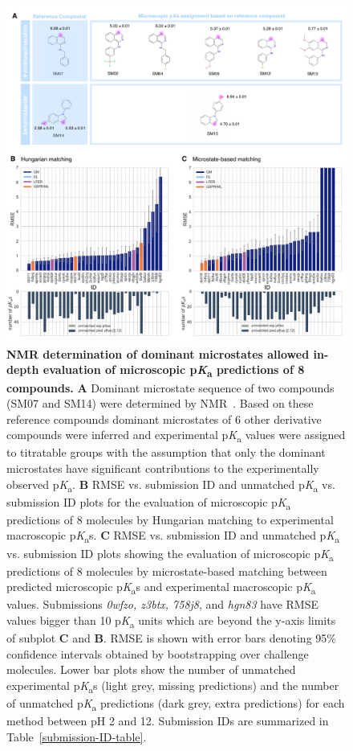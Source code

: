 \documentclass[9pt,lineno,final]{elife}
\newcommand{\pKa}{p\textit{K}\textsubscript{a}}
\begin{document}
\begin{figure}
\centering
\includegraphics[width=1.0\linewidth]{figures/typeI_8_mol_matching_comparison.pdf}
\caption{{\bf NMR determination of dominant microstates allowed in-depth evaluation of microscopic \pKa{} predictions of 8 compounds.} 
{\bf A} Dominant microstate sequence of two compounds (SM07 and SM14) were determined by NMR~\cite{Isik:2018:J.Comput.AidedMol.Des.}. Based on these reference compounds dominant microstates of 6 other derivative compounds were inferred and experimental \pKa{} values were assigned to titratable groups with the assumption that only the dominant microstates have significant contributions to the experimentally observed \pKa{}.
{\bf B} RMSE vs. submission ID and unmatched \pKa{} vs. submission ID plots for the evaluation of microscopic \pKa{} predictions of 8 molecules by Hungarian matching to experimental macroscopic \pKa{}s. {\bf C} RMSE vs. submission ID and unmatched \pKa{} vs. submission ID plots showing the evaluation of microscopic \pKa{} predictions of 8 molecules by microstate-based matching between predicted microscopic \pKa{}s and experimental macroscopic \pKa{} values. Submissions \textit{0wfzo, z3btx, 758j8}, and \textit{hgn83} have RMSE values bigger than 10 \pKa{} units which are beyond the y-axis limits of subplot {\bf C} and {\bf B}.
RMSE is shown with error bars denoting 95\% confidence intervals obtained by bootstrapping over challenge molecules. Lower bar plots show the number of unmatched experimental \pKa{}s (light grey, missing predictions) and the number of unmatched \pKa{} predictions (dark grey, extra predictions) for each method between pH 2 and 12. Submission IDs are summarized in Table~\ref{submission-ID-table}.
}
\label{fig:typeI-matching-algorithm-comparison}
\end{figure}
\end{document}
